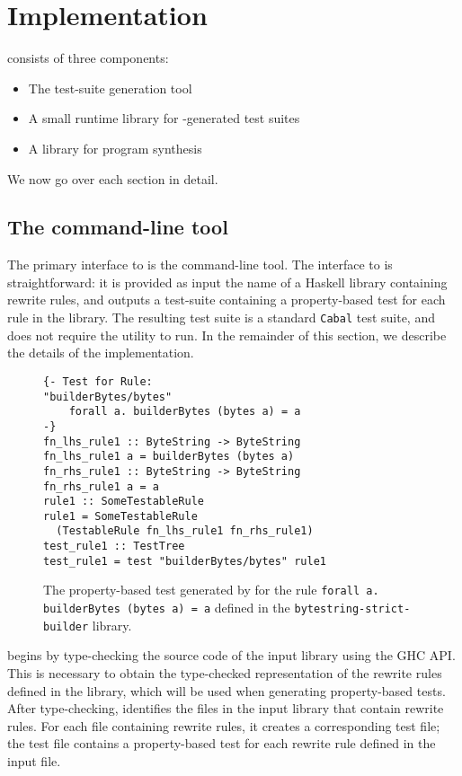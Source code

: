 \section{Implementation}
\label{sec:implementation}

\Rulecheck consists of three components:

\begin{itemize}
  \item The \rctool test-suite generation tool
  \item A small runtime library for \rctool-generated test suites
  \item A library for program synthesis
\end{itemize}

We now go over each section in detail.

\subsection{The \rctool command-line tool}\label{sec:implementation:testgen}

The primary interface to \Rulecheck is the \rctool command-line tool. The
interface to \rctool is straightforward: it is provided as input the name of a
Haskell library containing rewrite rules, and outputs a test-suite containing a
property-based test for each rule in the library. The resulting test suite is a
standard \texttt{Cabal} test suite, and does not require the \rctool utility to
run. In the remainder of this section, we describe the details of the \rctool
implementation.

\begin{figure}
  \begin{verbatim}
{- Test for Rule:
"builderBytes/bytes"
    forall a. builderBytes (bytes a) = a
-}
fn_lhs_rule1 :: ByteString -> ByteString
fn_lhs_rule1 a = builderBytes (bytes a)
fn_rhs_rule1 :: ByteString -> ByteString
fn_rhs_rule1 a = a
rule1 :: SomeTestableRule
rule1 = SomeTestableRule
  (TestableRule fn_lhs_rule1 fn_rhs_rule1)
test_rule1 :: TestTree
test_rule1 = test "builderBytes/bytes" rule1
   \end{verbatim}
   \caption{The property-based test generated by \rctool for the rule \texttt{forall a.
builderBytes (bytes a) = a} defined in the \texttt{bytestring-strict-builder}
library.}
    \label{fig:implementation:ruletest}
\end{figure}

\rctool begins by type-checking the source code of the input library using the
GHC API. This is necessary to obtain the type-checked representation of the
rewrite rules defined in the library, which will be used when generating
property-based tests. After type-checking, \rctool identifies the files in the
input library that contain rewrite rules. For each file containing rewrite
rules, it creates a corresponding test file; the test file contains a
property-based test for each rewrite rule defined in the input file.

